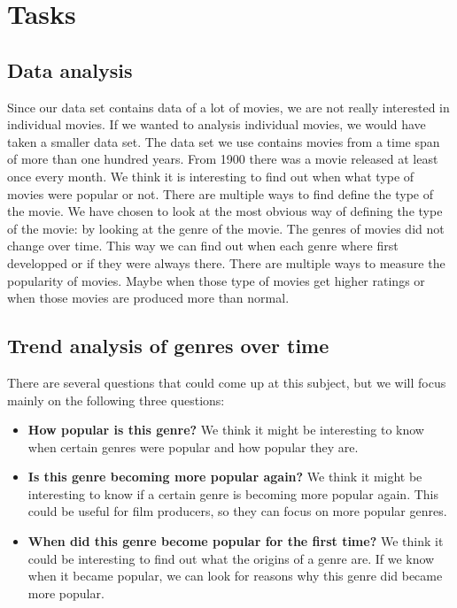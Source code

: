 \section{Tasks}\label{Sec:Tas}
\subsection{Data analysis}
Since our data set contains data of a lot of movies, we are not really interested in individual movies.
If we wanted to analysis individual movies, we would have taken a smaller data set.
The data set we use contains movies from a time span of more than one hundred years.
From 1900 there was a movie released at least once every month.
We think it is interesting to find out when what type of movies were popular or not.
There are multiple ways to find define the type of the movie. 
We have chosen to look at the most obvious way of defining the type of the movie: by looking at the genre of the movie.
The genres of movies did not change over time. 
This way we can find out when each genre where first developped or if they were always there. 
There are multiple ways to measure the popularity of movies. 
Maybe when those type of movies get higher ratings or when those movies are produced more than normal. 
\subsection{Trend analysis of genres over time }
There are several questions that could come up at this subject, but we will focus mainly on the following three questions:
\begin{itemize}
\item \textbf{How popular is this genre?}
We think it might be interesting to know when certain genres were popular and how popular they are. 
\item \textbf{Is this genre becoming more popular again?}
We think it might be interesting to know if a certain genre is becoming more popular again. 
This could be useful for film producers, so they can focus on more popular genres. 
\item \textbf{When did this genre become popular for the first time?} 
We think it could be interesting to find out what the origins of a genre are. 
If we know when it became popular, we can look for reasons why this genre did became more popular.
\end{itemize}
